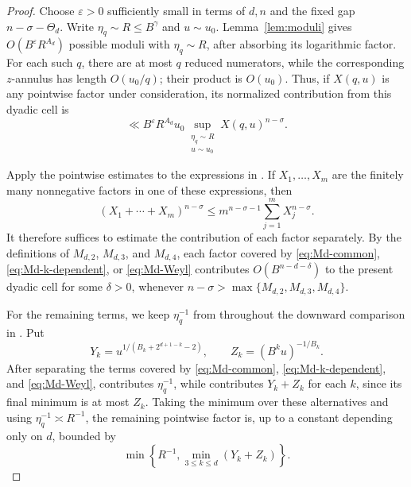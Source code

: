 \documentclass[reqno,a4paper,11pt]{amsart}
\numberwithin{equation}{section}
\newcommand{\eps}{\varepsilon}
\theoremstyle{plain}
\theoremstyle{definition}
\begin{document}
\begin{proof}
Choose \(\eps>0\) sufficiently small in terms of \(d,n\) and the fixed gap \(n-\sigma-\Theta_d\).
Write \(\eta_q\sim R\leq B^\gamma\) and \(u\sim u_0\).
Lemma~\ref{lem:moduli} gives \(O(B^\eps R^{A_d})\) possible moduli with \(\eta_q\sim R\), after absorbing its logarithmic factor.
For each such \(q\), there are at most \(q\) reduced numerators, while the corresponding \(z\)-annulus has length \(O(u_0/q)\); their product is \(O(u_0)\).
Thus, if \(X(q,u)\) is any pointwise factor under consideration, its normalized contribution from this dyadic cell is
\[
 \ll B^\eps R^{A_d}u_0
 \sup_{\substack{\eta_q\sim R\\u\sim u_0}}
 X(q,u)^{n-\sigma}.
\]

Apply the pointwise estimates \cite[Propositions~3.6 and~3.7]{bp} to the expressions in \cite[Eq.~(4.3) and Eq.~(4.4)]{bp}.
If \(X_1,\ldots,X_m\) are the finitely many nonnegative factors in one of these expressions, then
\[
 (X_1+\cdots+X_m)^{n-\sigma}
 \leq m^{n-\sigma-1}\sum_{j=1}^m X_j^{n-\sigma}.
\]
It therefore suffices to estimate the contribution of each factor separately.
By the definitions of \(M_{d,2}\), \(M_{d,3}\), and \(M_{d,4}\), each factor covered by \eqref{eq:Md-common}, \eqref{eq:Md-k-dependent}, or \eqref{eq:Md-Weyl} contributes \(O(B^{n-d-\delta})\) to the present dyadic cell for some \(\delta>0\), whenever \(n-\sigma>\max\{M_{d,2},M_{d,3},M_{d,4}\}\).

For the remaining terms, we keep \(\eta_q^{-1}\) from \cite[Eq.~(4.3)]{bp} throughout the downward comparison in \cite[Eq.~(4.6) and Proofs of Lemmas~4.6 and~4.7]{bp}.
Put
\[
 Y_k=u^{1/(B_k+2^{d+1-k}-2)},
 \qquad
 Z_k=(B^ku)^{-1/B_k}.
\]
After separating the terms covered by \eqref{eq:Md-common}, \eqref{eq:Md-k-dependent}, and \eqref{eq:Md-Weyl}, \cite[Eq.~(4.3)]{bp} contributes \(\eta_q^{-1}\), while \cite[Eq.~(4.4)]{bp} contributes \(Y_k+Z_k\) for each \(k\), since its final minimum is at most \(Z_k\).
Taking the minimum over these alternatives and using \(\eta_q^{-1}\asymp R^{-1}\), the remaining pointwise factor is, up to a constant depending only on \(d\), bounded by
\begin{equation}\label{eq:downward-factor}
 \min\left\{R^{-1},\min_{3\leq k\leq d}(Y_k+Z_k)\right\}.
\end{equation}


\end{proof}
\end{document}
